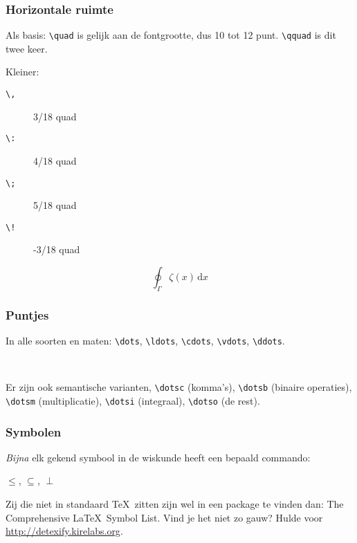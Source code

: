 \begin{frame}
  \frametitle{Horizontale ruimte}

  Als basis: \texttt{\textcolor{uagreen}{\textbackslash quad}} is gelijk aan de fontgrootte, dus 10 tot 12 punt. \texttt{\textcolor{uagreen}{\textbackslash qquad}} is dit twee keer.

  Kleiner:
  \begin{description}
    \item[\texttt{\textbackslash,}] 3/18 quad
    \item[\texttt{\textbackslash:}] 4/18 quad
    \item[\texttt{\textbackslash;}] 5/18 quad
    \item[\texttt{\textbackslash!}] -3/18 quad
  \end{description}

  \begin{equation}
    \oint_\Gamma \zeta(x)\,\mathrm{d}x
  \end{equation}
\end{frame}

\begin{frame}
  \frametitle{Puntjes}

  In alle soorten en maten: \texttt{\textcolor{uagreen}{\textbackslash dots}}, \texttt{\textcolor{uagreen}{\textbackslash ldots}}, \texttt{\textcolor{uagreen}{\textbackslash cdots}}, \texttt{\textcolor{uagreen}{\textbackslash vdots}}, \texttt{\textcolor{uagreen}{\textbackslash ddots}}.

  {\ }

  Er zijn ook semantische varianten, \texttt{\textcolor{uagreen}{\textbackslash dotsc}} (komma's), \texttt{\textcolor{uagreen}{\textbackslash dotsb}} (binaire operaties), \texttt{\textcolor{uagreen}{\textbackslash dotsm}} (multiplicatie), \texttt{\textcolor{uagreen}{\textbackslash dotsi}} (integraal), \texttt{\textcolor{uagreen}{\textbackslash dotso}} (de rest).
\end{frame}

\begin{frame}[fragile]
  \frametitle{Symbolen}

  \emph{Bijna} elk gekend symbool in de wiskunde heeft een bepaald commando:
  \small
  \begin{LTXexample}
$\leq$, $\subseteq$, $\perp$
  \end{LTXexample}

  \normalsize
  Zij die niet in standaard \TeX\ zitten zijn wel in een package te vinden dan: The Comprehensive \LaTeX\ Symbol List. Vind je het niet zo gauw? Hulde voor \url{http://detexify.kirelabs.org}.
\end{frame}

